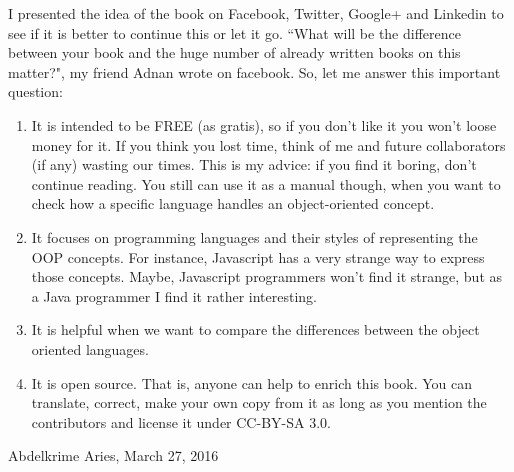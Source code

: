 \documentclass[12pt]{book}
\begin{document}
I presented the idea of the book on Facebook, Twitter, Google+ and Linkedin to see if it is better to continue this or let it go.
``What will be the difference between your book and the huge number of already written books on this matter?", my friend Adnan wrote on facebook.
So, let me answer this important question:
\begin{enumerate}
\item It is intended to be FREE (as gratis), so if you don't like it you won't loose money for it.
If you think you lost time, think of me and future collaborators (if any) wasting our times.
This is my advice: if you find it boring, don't continue reading.
You still can use it as a manual though, when you want to check how a specific language handles an object-oriented concept.

\item It focuses on programming languages and their styles of representing the OOP concepts.
For instance, Javascript has a very strange way to express those concepts.
Maybe, Javascript programmers won't find it strange, but as a Java programmer I find it rather interesting.

\item It is helpful when we want to compare the differences between the object oriented languages.

\item It is open source.
That is, anyone can help to enrich this book.
You can translate, correct, make your own copy from it as long as you mention the contributors and license it under CC-BY-SA 3.0.

\end{enumerate}
\vfill
\begin{flushright}
Abdelkrime Aries, March 27, 2016
\end{flushright}

\ifx\wholebook\relax\else
% 
% 
	
\end{document}
